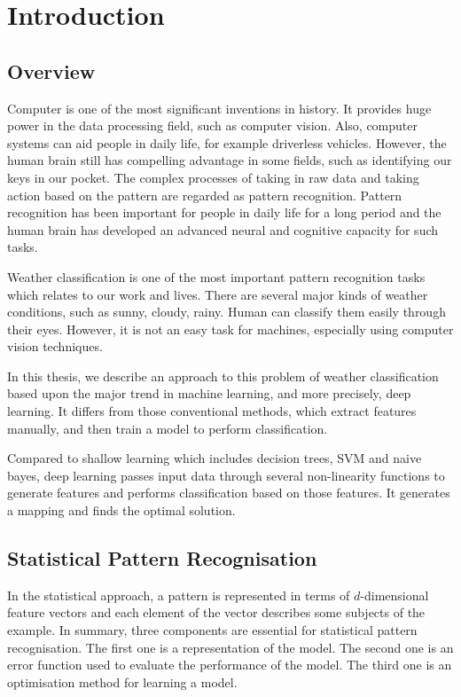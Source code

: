\chapter{Introduction} %
\label{Chapter1}


\section{Overview}

Computer is one of the most significant inventions in history. It provides huge power in the data processing field, such as computer vision. Also, computer systems can aid people in daily life, for example driverless vehicles. However, the human brain still has compelling advantage in some fields, such as identifying our keys in our pocket. The complex processes of taking in raw data and taking action based on the pattern are regarded as pattern recognition. Pattern recognition has been important for people in daily life for a long period and the human brain has developed an advanced neural and cognitive capacity for such tasks.

Weather classification is one of the most important pattern recognition tasks which relates to our work and lives. There are several major kinds of weather conditions, such as sunny, cloudy, rainy. Human can classify them easily through their eyes. However, it is not an easy task for machines, especially using computer vision techniques. 

In this thesis, we describe an approach to this problem of weather classification based upon the major trend in machine learning, and more precisely, deep learning. It differs from those conventional methods, which extract features manually, and then train a model to perform classification.

Compared to shallow learning which includes decision trees, SVM and naive bayes, deep learning passes input data through several non-linearity functions to generate features and performs classification based on those features. It generates a mapping and finds the optimal solution.

\section{Statistical Pattern Recognisation}

In the statistical approach, a pattern is represented in terms of $d$-dimensional feature vectors and each element of the vector describes some subjects of the example. In summary, three components are essential for statistical pattern recognisation. The first one is a representation of the model. The second one is an error function used to evaluate the performance of the model. The third one is an optimisation method for learning a model.

